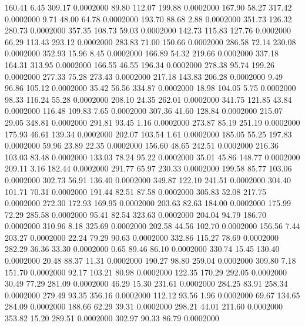  160.41    6.45  309.17   0.0002000
  89.80  112.07  199.88   0.0002000
 167.90   58.27  317.42   0.0002000
   9.71   48.00   64.78   0.0002000
 193.70   88.68    2.88   0.0002000
 351.73  126.32  280.73   0.0002000
 357.35  108.73   59.03   0.0002000
 142.73  115.83  127.76   0.0002000
  66.29  113.43  293.12   0.0002000
 283.83   71.00  150.66   0.0002000
 286.58   72.14  230.08   0.0002000
 352.93   15.96    8.45   0.0002000
 166.89   54.32  219.66   0.0002000
 337.18  164.31  313.95   0.0002000
 166.55   46.55  196.34   0.0002000
 278.38   95.74  199.26   0.0002000
 277.33   75.28  273.43   0.0002000
 217.18  143.83  206.28   0.0002000
   9.49   96.86  105.12   0.0002000
  35.42   56.56  334.87   0.0002000
  18.98  104.05    5.75   0.0002000
  98.33  116.24   55.28   0.0002000
 208.10   24.35  262.01   0.0002000
 341.75  121.85   43.84   0.0002000
 116.48  109.83    7.65   0.0002000
 307.36   41.60  128.84   0.0002000
 215.07   29.05  348.81   0.0002000
 291.81   93.45    1.16   0.0002000
 273.87   85.19  251.19   0.0002000
 175.93   46.61  139.34   0.0002000
 202.07  103.54    1.61   0.0002000
 185.05   55.25  197.83   0.0002000
  59.96   23.89   22.35   0.0002000
 156.60   48.65  242.51   0.0002000
 216.36  103.03   83.48   0.0002000
 133.03   78.24   95.22   0.0002000
  35.01   45.86  148.77   0.0002000
 209.11    3.16  182.44   0.0002000
 291.77   65.97  230.33   0.0002000
 199.58   85.77  103.06   0.0002000
 302.73   56.91  136.40   0.0002000
 349.87  122.10  241.51   0.0002000
 304.40  101.71   70.31   0.0002000
 191.44   82.51   87.58   0.0002000
 305.83   52.08  217.75   0.0002000
 272.30  172.93  169.95   0.0002000
 203.63   82.63  184.00   0.0002000
 175.99   72.29  285.58   0.0002000
  95.41   82.54  323.63   0.0002000
 204.04   94.79  186.70   0.0002000
 310.96    8.18  325.69   0.0002000
 202.58   44.56  102.70   0.0002000
 156.56    7.44  203.27   0.0002000
  22.24   79.29   90.63   0.0002000
 332.86  115.27   78.69   0.0002000
 282.29   36.36   33.30   0.0002000
   0.65   89.46   86.10   0.0002000
 330.74   15.45  130.40   0.0002000
  20.48   88.37   11.31   0.0002000
 190.27   98.80  259.04   0.0002000
 309.80    7.18  151.70   0.0002000
  92.17  103.21   80.98   0.0002000
 122.35  170.29  292.05   0.0002000
  30.49   77.29  281.09   0.0002000
  46.29   15.30  231.61   0.0002000
 284.25   83.91  258.34   0.0002000
 279.49   93.35  356.16   0.0002000
 112.12   93.56    1.96   0.0002000
  69.67  134.65  284.09   0.0002000
 188.66   62.29   39.31   0.0002000
 298.21   44.01  211.60   0.0002000
 353.82   15.20  289.51   0.0002000
 302.97   90.33   86.79   0.0002000

